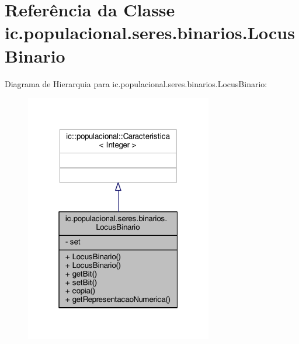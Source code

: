\hypertarget{classic_1_1populacional_1_1seres_1_1binarios_1_1_locus_binario}{\section{Referência da Classe ic.\-populacional.\-seres.\-binarios.\-Locus\-Binario}
\label{classic_1_1populacional_1_1seres_1_1binarios_1_1_locus_binario}
}


Diagrama de Hierarquia para ic.\-populacional.\-seres.\-binarios.\-Locus\-Binario\-:
\nopagebreak
\begin{figure}[H]
\begin{center}
\leavevmode
\includegraphics[width=232pt]{classic_1_1populacional_1_1seres_1_1binarios_1_1_locus_binario__inherit__graph}
\end{center}
\end{figure}


